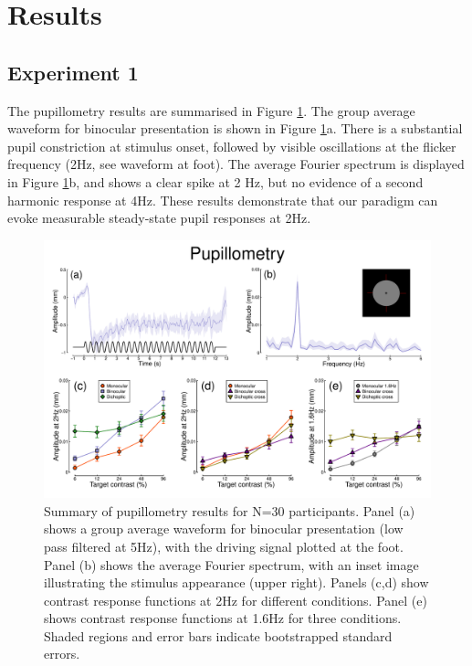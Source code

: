 \documentclass[
]{article}
\begin{document}
\hypertarget{results}{%
\section{Results}\label{results}}

\hypertarget{experiment-1}{%
\subsection{Experiment 1}\label{experiment-1}}

The pupillometry results are summarised in Figure \ref{fig:pupildata}. The group average waveform for binocular presentation is shown in Figure \ref{fig:pupildata}a. There is a substantial pupil constriction at stimulus onset, followed by visible oscillations at the flicker frequency (2Hz, see waveform at foot). The average Fourier spectrum is displayed in Figure \ref{fig:pupildata}b, and shows a clear spike at 2 Hz, but no evidence of a second harmonic response at 4Hz. These results demonstrate that our paradigm can evoke measurable steady-state pupil responses at 2Hz.

\begin{figure}

{\centering \includegraphics{Figures/pupildata} 

}

\caption{Summary of pupillometry results for N=30 participants. Panel (a) shows a group average waveform for binocular presentation (low pass filtered at 5Hz), with the driving signal plotted at the foot. Panel (b) shows the average Fourier spectrum, with an inset image illustrating the stimulus appearance (upper right). Panels (c,d) show contrast response functions at 2Hz for different conditions. Panel (e) shows contrast response functions at 1.6Hz for three conditions. Shaded regions and error bars indicate bootstrapped standard errors.}\label{fig:pupildata}
\end{figure}
\end{document}
